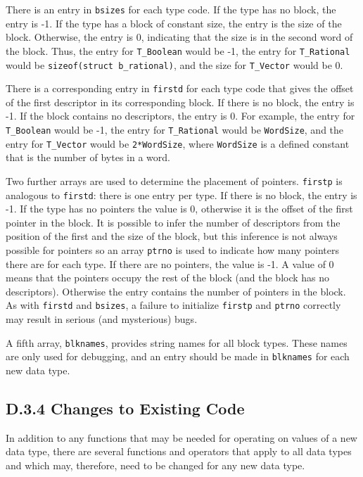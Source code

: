 There is an entry in \texttt{bsizes} for each type code. If the type has no
block, the entry is -1. If the type has a block of constant size, the entry
is the size of the block. Otherwise, the entry is 0, indicating that the
size is in the second word of the block. Thus, the entry for
\texttt{T\_Boolean} would be -1, the entry for \texttt{T\_Rational} would
be \texttt{sizeof(struct b\_rational)}, and the size for \texttt{T\_Vector}
would be 0.

There is a corresponding entry in \texttt{firstd} for each type code that
gives the offset of the first descriptor in its corresponding block. If
there is no block, the entry is -1. If the block contains no descriptors,
the entry is 0. For example, the entry for \texttt{T\_Boolean} would be -1,
the entry for \texttt{T\_Rational} would be \texttt{WordSize}, and the
entry for \texttt{T\_Vector} would be \texttt{2*WordSize}, where
\texttt{WordSize} is a defined constant that is the number of bytes in a
word.

Two further arrays are used to determine the placement of pointers.
\texttt{firstp} is analogous to \texttt{firstd}: there is one entry per
type. If there is no block, the entry is -1. If the type has no pointers
the value is 0, otherwise it is the offset of the first pointer in the
block.  It is possible to infer the number of descriptors from the position
of the first and the size of the block, but this inference is not always
possible for pointers so an array \texttt{ptrno} is used to indicate how
many pointers there are for each type. If there are no pointers, the value
is -1. A value of 0 means that the pointers occupy the rest of the block
(and the block has no descriptors). Otherwise the entry contains the number
of pointers in the block. As with \texttt{firstd} and \texttt{bsizes}, a
failure to initialize \texttt{firstp} and \texttt{ptrno} correctly may
result in serious (and mysterious) bugs.

A fifth array, \texttt{blknames}, provides string names for all block
types. These names are only used for debugging, and an entry should be
made in \texttt{blknames} for each new data type.

\subsection[D.3.4 Changes to Existing Code]{D.3.4 Changes to Existing Code}

In addition to any functions that may be needed for operating on
values of a new data type, there are several functions and operators
that apply to all data types and which may, therefore, need to be
changed for any new data type.

